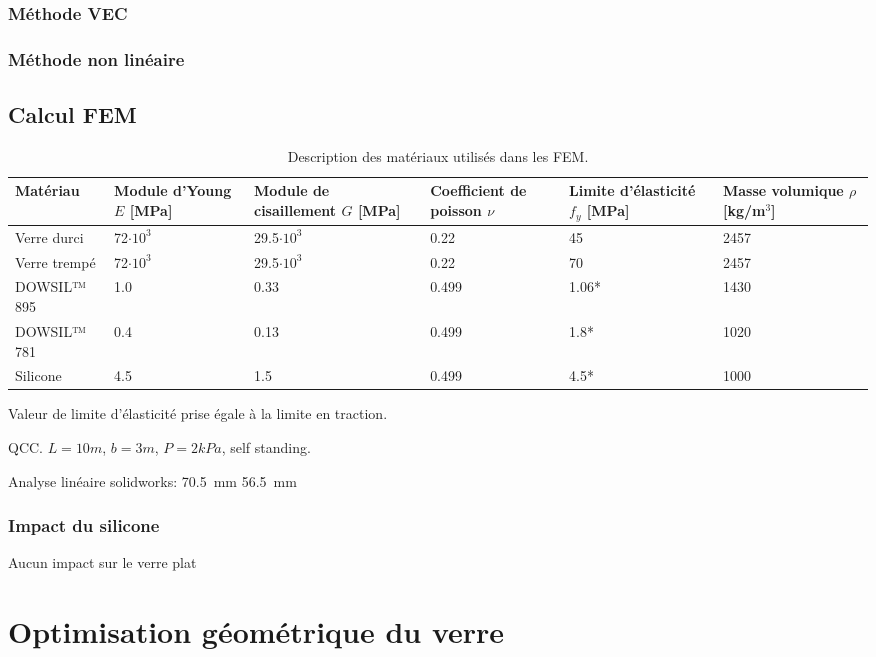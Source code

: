 \documentclass[11pt,titlepage]{article}
\begin{document}
\subsubsection{Méthode VEC}
\subsubsection{Méthode non linéaire}

\subsection{Calcul FEM}\label{sec:temoin}
\begin{table}[H]
\begin{center}
\caption{Description des matériaux utilisés dans les \acrshort{FEM}.}
\label{tab:mat_autoportant}
\begin{tabularx}{\textwidth}{l*{5}{Y}}
\toprule
\textbf{Matériau} & \textbf{Module d'Young} $E$ [MPa] & \textbf{Module de cisaillement} $G$ [MPa]&\textbf{Coefficient de poisson} $\nu$ & \textbf{Limite d'élasticité} $f_y$ [MPa]& \textbf{Masse volumique} $\rho$ [kg/m$^3$] \\\midrule
Verre durci & 72$\cdot 10^3$ & 29.5$\cdot 10^3$ & 0.22 &45 & 2457 \\
Verre trempé & 72$\cdot 10^3$ & 29.5$\cdot 10^3$ & 0.22 &70 & 2457 \\
DOWSIL™ 895 & 1.0 & 0.33 & 0.499 & 1.06* & 1430 \\
DOWSIL™ 781 & 0.4 & 0.13 & 0.499 & 1.8* & 1020 \\
Silicone & 4.5 & 1.5 & 0.499 & 4.5* & 1000\\
\bottomrule
\end{tabularx}
\end{center}
{\RaggedLeft \footnotesize * Valeur de limite d'élasticité prise égale à la limite en traction.}\end{table}
QCC. $L=10m$, $b=3m$, $P=2kPa$, self standing.

Analyse linéaire solidworks: \qty{70.5}{\milli\meter} \qty{56.5}{\milli\meter}
\subsubsection{Impact du silicone}
Aucun impact sur le verre plat

\newpage

\section{Optimisation géométrique du verre}
\end{document}
